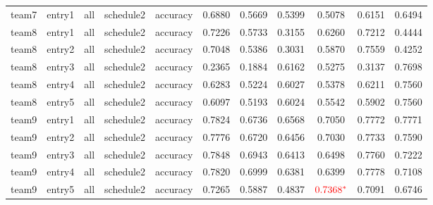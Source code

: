 \begin{footnotesize}
\begin{tabular}{c|c|c|c|c|c|c|c|c|c|c}
team7&entry1&all&schedule2&accuracy&0.6880&0.5669&0.5399&0.5078&0.6151&0.6494\\
team8&entry1&all&schedule2&accuracy&0.7226&0.5733&0.3155&0.6260&0.7212&0.4444\\
team8&entry2&all&schedule2&accuracy&0.7048&0.5386&0.3031&0.5870&0.7559&0.4252\\
team8&entry3&all&schedule2&accuracy&0.2365&0.1884&0.6162&0.5275&0.3137&0.7698\\
team8&entry4&all&schedule2&accuracy&0.6283&0.5224&0.6027&0.5378&0.6211&0.7560\\
team8&entry5&all&schedule2&accuracy&0.6097&0.5193&0.6024&0.5542&0.5902&0.7560\\
team9&entry1&all&schedule2&accuracy&0.7824&0.6736&0.6568&0.7050&0.7772&0.7771\\
team9&entry2&all&schedule2&accuracy&0.7776&0.6720&0.6456&0.7030&0.7733&0.7590\\
team9&entry3&all&schedule2&accuracy&0.7848&0.6943&0.6413&0.6498&0.7760&0.7222\\
team9&entry4&all&schedule2&accuracy&0.7820&0.6999&0.6381&0.6399&0.7778&0.7108\\
team9&entry5&all&schedule2&accuracy&0.7265&0.5887&0.4837&{$\color{red}0.7368^*$}&0.7091&0.6746\\
\end{tabular}
\end{footnotesize}